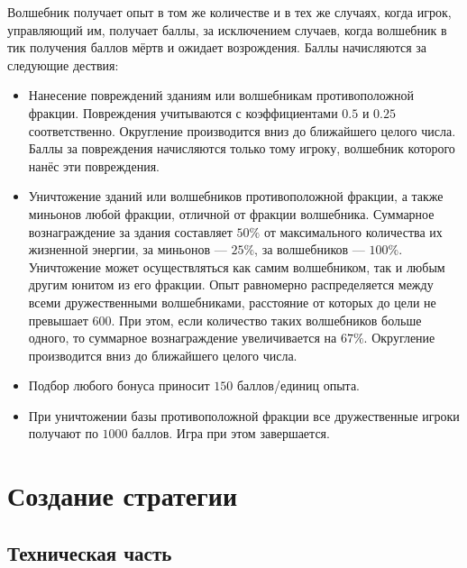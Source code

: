Волшебник получает опыт в том же количестве и в тех же случаях, когда игрок, управляющий им, получает баллы, за исключением случаев, когда
волшебник в тик получения баллов мёртв и ожидает возрождения. Баллы начисляются за следующие дествия:
\begin{itemize}
    \item Нанесение повреждений зданиям или волшебникам противоположной фракции. Повреждения учитываются с коэффициентами $0.5$ и $0.25$
        соответственно. Округление производится вниз до ближайшего целого числа. Баллы за повреждения начисляются только тому игроку,
        волшебник которого нанёс эти повреждения.
    \item Уничтожение зданий или волшебников противоположной фракции, а также миньонов любой фракции, отличной от фракции волшебника.
        Суммарное вознаграждение за здания составляет $50\%$ от максимального количества их жизненной энергии, за миньонов --- $25\%$, за
        волшебников --- $100\%$. Уничтожение может осуществляться как самим волшебником, так и любым другим юнитом из его фракции. Опыт
        равномерно распределяется между всеми дружественными волшебниками, расстояние от которых до цели не превышает $600$. При этом, если
        количество таких волшебников больше одного, то суммарное вознаграждение увеличивается на $67\%$. Округление производится вниз до
        ближайшего целого числа.
    \item Подбор любого бонуса приносит $150$ баллов/единиц опыта.
    \item При уничтожении базы противоположной фракции все дружественные игроки получают по $1000$ баллов. Игра при этом завершается.
\end{itemize}

\chapter{Создание стратегии}

\section{Техническая часть}


